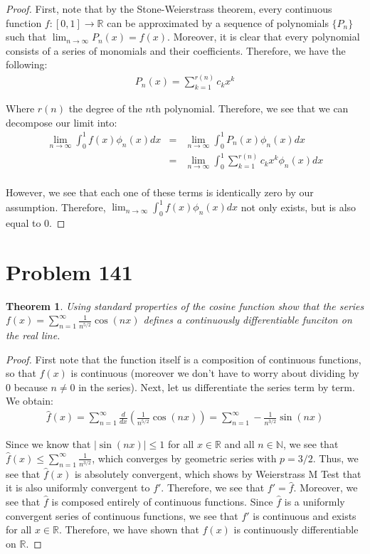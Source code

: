 \documentclass[psamsfonts]{amsart}
\newtheorem{thm}{Theorem}[section]
\theoremstyle{definition}
\theoremstyle{remark}
\numberwithin{equation}{section}
\begin{document}
\begin{proof}
First, note that by the Stone-Weierstrass theorem, every continuous function $f: [0,1] \to \mathbb{R}$ can be approximated by a sequence of polynomials $\{ P_n \}$ such that $\lim_{n \to \infty} P_n(x) = f(x)$. Moreover, it is clear that every polynomial consists of a series of monomials and their coefficients. Therefore, we have the following:
\begin{eqnarray}
P_n(x) = \sum_{k=1}^{r(n)} c_k x^k
\end{eqnarray}

Where $r(n)$ the degree of the $n$th polynomial. Therefore, we see that we can decompose our limit into:
\begin{eqnarray}
\lim_{n \to \infty} \int_0^1 f(x) \phi_n (x) dx &=& \lim_{n \to \infty} \int_0^1 P_n(x) \phi_n(x) dx \\
&=& \lim_{n \to \infty} \int_0^1 \sum_{k=1}^{r(n)} c_k x^k \phi_n(x) dx \\
\end{eqnarray}

However, we see that each one of these terms is identically zero by our assumption. Therefore, $\lim_{n \to \infty} \int_0^1 f(x) \phi_n (x) dx$ not only exists, but is also equal to $0$.
\end{proof}

\section{Problem 141}

\begin{thm}
Using standard properties of the cosine function show that the series $f(x) = \sum_{n=1}^\infty \frac{1}{n^{5/2}} \cos(nx)$ defines a continuously differentiable funciton on the real line.
\end{thm}

\begin{proof}
First note that the function itself is a composition of continuous functions, so that $f(x)$ is continuous (moreover we don't have to worry about dividing by $0$ because $n \neq 0$ in the series). Next, let us differentiate the series term by term. We obtain:
\begin{eqnarray}
\hat{f}(x) = \sum_{n=1}^\infty \frac{d}{dx} \left( \frac{1}{n^{5/2}} \cos (nx) \right)= \sum_{n=1}^\infty - \frac{1}{n^{3/2}} \sin ( nx) 
\end{eqnarray}

Since we know that $|\sin(nx) | \leq 1$ for all $x \in \mathbb{R}$ and all $n \in \mathbb{N}$, we see that $\hat{f}(x) \leq \sum_{n=1}^\infty \frac{1}{n^{3/2}}$, which converges by geometric series with $p = 3/2$. Thus, we see that $\hat{f}(x)$ is absolutely convergent, which shows by Weierstrass M Test that it is also uniformly convergent to $f'$. Therefore, we see that $f' = \hat{f}$. Moreover, we see that $\hat{f}$ is composed entirely of continuous functions. Since $\hat{f}$ is a uniformly convergent series of continuous functions, we see that $f'$ is continuous and exists for all $x \in \mathbb{R}$. Therefore, we have shown that $f(x)$ is continuously differentiable on $\mathbb{R}$. 
\end{proof}
\end{document}
